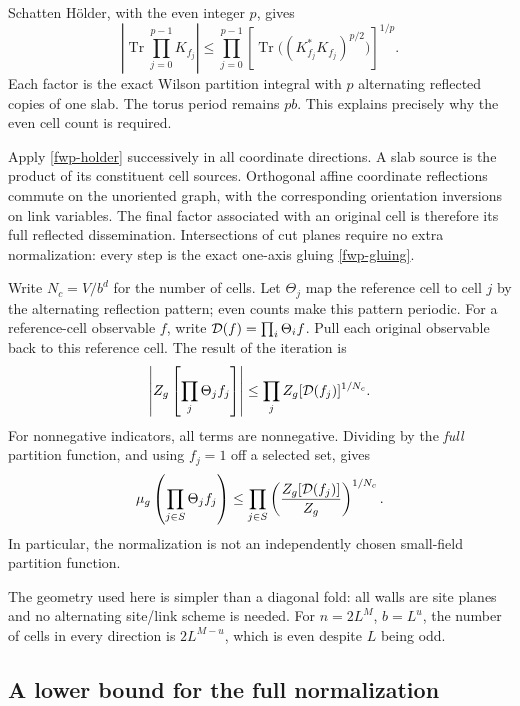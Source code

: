 \documentclass[11pt]{article}
\theoremstyle{remark}
\begin{document}
Schatten H\"older, with the even integer \(p\), gives
\begin{equation}
 \left|\operatorname{Tr}\prod_{j=0}^{p-1}K_{f_j}\right|
 \le\prod_{j=0}^{p-1}
 \left[\operatorname{Tr}\bigl((K_{f_j}^*K_{f_j})^{p/2}\bigr)
                                                  \right]^{1/p}.
 \label{fwp-holder}
\end{equation}
Each factor is the exact Wilson partition integral with \(p\) alternating
reflected copies of one slab. The torus period remains \(pb\).
This explains precisely why the even cell count is required.

Apply \eqref{fwp-holder} successively in all coordinate directions.
A slab source is the product of its constituent cell sources.
Orthogonal affine coordinate reflections commute on the unoriented
graph, with the corresponding orientation inversions on link variables.
The final factor associated with an original cell is therefore its
full reflected dissemination. Intersections of cut planes require no
extra normalization: every step is the exact one-axis gluing
\eqref{fwp-gluing}.

Write \(N_c=V/b^d\) for the number of cells. Let \(\Theta_j\) map the
reference cell to cell \(j\) by the alternating reflection pattern;
even counts make this pattern periodic. For a reference-cell observable
\(f\), write
\({\cal D}(f)=\prod_i\Theta_i f\).
Pull each original observable back to this reference cell.
The result of the iteration is
\begin{equation}
 \left|Z_g\left[\prod_j\Theta_j f_j\right]\right|
 \le\prod_j Z_g[{\cal D}(f_j)]^{1/N_c}.
 \label{fwp-chessboard}
\end{equation}
For nonnegative indicators, all terms are nonnegative. Dividing by the
\emph{full} partition function, and using \(f_j=1\) off a selected set,
gives
\begin{equation}
 \mu_g\left(\prod_{j\in S}\Theta_j f_j\right)
 \le\prod_{j\in S}
       \left(\frac{Z_g[{\cal D}(f_j)]}{Z_g}\right)^{1/N_c}.
 \label{fwp-normalized}
\end{equation}
In particular, the normalization is not an independently chosen
small-field partition function.

The geometry used here is simpler than a diagonal fold: all walls are
site planes and no alternating site/link scheme is needed.
For \(n=2L^M\), \(b=L^u\), the number of cells in every direction is
\(2L^{M-u}\), which is even despite \(L\) being odd.

\subsection{A lower bound for the full normalization}
\label{fwp-normalization-section}
\end{document}
